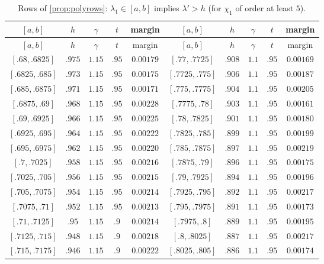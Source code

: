 \documentclass[11pt]{amsart}
\numberwithin{equation}{section}
\theoremstyle{plain}
\theoremstyle{definition}
\theoremstyle{remark}
\newcommand{\1}{\mathbf{1}}
\begin{document}
\begin{center}
\scriptsize
\begin{longtable}{@{}ccccc@{\qquad}ccccc@{}}
\caption{Rows of \cref{prop:polyrows}: $\lambda_1\in[a,b]$ implies $\lambda'>h$ (for $\chi_1$ of order at least $5$).}\label{tab:polyrows}\\
\toprule
$[a,b]$ & $h$ & $\gamma$ & $t$ & margin & $[a,b]$ & $h$ & $\gamma$ & $t$ & margin \\
\midrule
\endfirsthead
\toprule
$[a,b]$ & $h$ & $\gamma$ & $t$ & margin & $[a,b]$ & $h$ & $\gamma$ & $t$ & margin \\
\midrule
\endhead
\bottomrule
\endfoot
$[.68,.6825]$ & $.975$ & $1.15$ & $.95$ & $0.00179$ & $[.77,.7725]$ & $.908$ & $1.1$ & $.95$ & $0.00169$ \\
$[.6825,.685]$ & $.973$ & $1.15$ & $.95$ & $0.00175$ & $[.7725,.775]$ & $.906$ & $1.1$ & $.95$ & $0.00187$ \\
$[.685,.6875]$ & $.971$ & $1.15$ & $.95$ & $0.00171$ & $[.775,.7775]$ & $.904$ & $1.1$ & $.95$ & $0.00205$ \\
$[.6875,.69]$ & $.968$ & $1.15$ & $.95$ & $0.00228$ & $[.7775,.78]$ & $.903$ & $1.1$ & $.95$ & $0.00161$ \\
$[.69,.6925]$ & $.966$ & $1.15$ & $.95$ & $0.00225$ & $[.78,.7825]$ & $.901$ & $1.1$ & $.95$ & $0.00180$ \\
$[.6925,.695]$ & $.964$ & $1.15$ & $.95$ & $0.00222$ & $[.7825,.785]$ & $.899$ & $1.1$ & $.95$ & $0.00199$ \\
$[.695,.6975]$ & $.962$ & $1.15$ & $.95$ & $0.00220$ & $[.785,.7875]$ & $.897$ & $1.1$ & $.95$ & $0.00219$ \\
$[.7,.7025]$ & $.958$ & $1.15$ & $.95$ & $0.00216$ & $[.7875,.79]$ & $.896$ & $1.1$ & $.95$ & $0.00175$ \\
$[.7025,.705]$ & $.956$ & $1.15$ & $.95$ & $0.00215$ & $[.79,.7925]$ & $.894$ & $1.1$ & $.95$ & $0.00196$ \\
$[.705,.7075]$ & $.954$ & $1.15$ & $.95$ & $0.00214$ & $[.7925,.795]$ & $.892$ & $1.1$ & $.95$ & $0.00217$ \\
$[.7075,.71]$ & $.952$ & $1.15$ & $.95$ & $0.00213$ & $[.795,.7975]$ & $.891$ & $1.1$ & $.95$ & $0.00173$ \\
$[.71,.7125]$ & $.95$ & $1.15$ & $.9$ & $0.00214$ & $[.7975,.8]$ & $.889$ & $1.1$ & $.95$ & $0.00195$ \\
$[.7125,.715]$ & $.948$ & $1.15$ & $.9$ & $0.00218$ & $[.8,.8025]$ & $.887$ & $1.1$ & $.95$ & $0.00217$ \\
$[.715,.7175]$ & $.946$ & $1.15$ & $.9$ & $0.00222$ & $[.8025,.805]$ & $.886$ & $1.1$ & $.95$ & $0.00174$ \\

\end{longtable}
\end{center}
\end{document}
